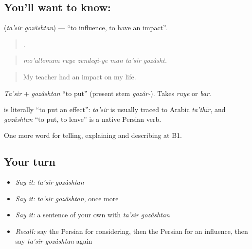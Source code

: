 \subsection*{You'll want to know:  }
\textbf{ } (\emph{ta'sir gozâshtan}) — \textquotedblleft{}to influence, to have an impact\textquotedblright{}.

\begin{quote}
     .
\end{quote}

\begin{quote}
\emph{mo'allemam ruye zendegi-ye man ta'sir gozâsht.}
\end{quote}

\begin{quote}
My teacher had an impact on my life.
\end{quote}

\emph{Ta'sir} + \emph{gozâshtan} \textquotedblleft{}to put\textquotedblright{} (present stem \emph{gozâr-}). Takes \emph{ruye} or \emph{bar}.

\begin{cousinweb}
\textbf{ } is literally \textquotedblleft{}to put an effect\textquotedblright{}: \emph{ta'sir} is usually traced to Arabic \emph{ta'thīr}, and \emph{gozâshtan} \textquotedblleft{}to put, to leave\textquotedblright{} is a native Persian verb.
\end{cousinweb}

\begin{grammarlens}[title={What you've built}]
One more word for telling, explaining and describing at B1.
\end{grammarlens}

\subsection*{Your turn}
\begin{itemize}
\raggedright
  \item \emph{Say it:} \emph{ta'sir gozâshtan}
  \item \emph{Say it:} \emph{ta'sir gozâshtan}, once more
  \item \emph{Say it:} a sentence of your own with \emph{ta'sir gozâshtan}
  \item \emph{Recall:} say the Persian for considering, then the Persian for an influence, then say \emph{ta'sir gozâshtan} again
\end{itemize}

